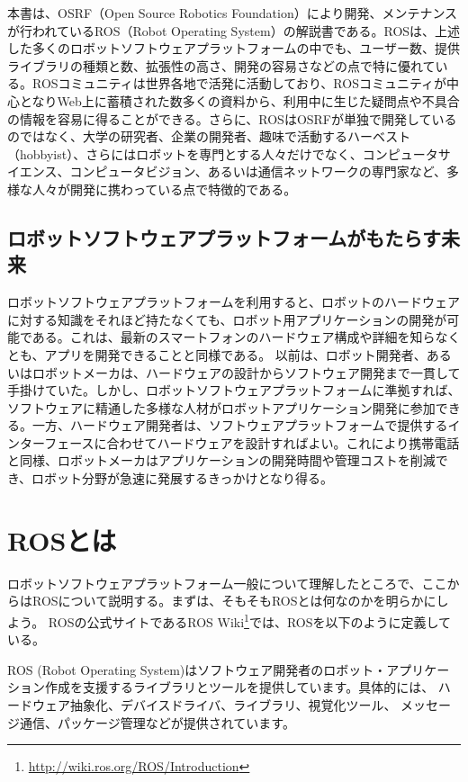 本書は、OSRF（Open Source Robotics Foundation）により開発、メンテナンスが行われているROS（Robot Operating System）の解説書である。ROSは、上述した多くのロボットソフトウェアプラットフォームの中でも、ユーザー数、提供ライブラリの種類と数、拡張性の高さ、開発の容易さなどの点で特に優れている。ROSコミュニティは世界各地で活発に活動しており、ROSコミュニティが中心となりWeb上に蓄積された数多くの資料から、利用中に生じた疑問点や不具合の情報を容易に得ることができる。さらに、ROSはOSRFが単独で開発しているのではなく、大学の研究者、企業の開発者、趣味で活動するハーベスト（hobbyist）、さらにはロボットを専門とする人々だけでなく、コンピュータサイエンス、コンピュータビジョン、あるいは通信ネットワークの専門家など、多様な人々が開発に携わっている点で特徴的である。

\subsection{ロボットソフトウェアプラットフォームがもたらす未来}

ロボットソフトウェアプラットフォームを利用すると、ロボットのハードウェアに対する知識をそれほど持たなくても、ロボット用アプリケーションの開発が可能である。これは、最新のスマートフォンのハードウェア構成や詳細を知らなくとも、アプリを開発できることと同様である。
以前は、ロボット開発者、あるいはロボットメーカは、ハードウェアの設計からソフトウェア開発まで一貫して手掛けていた。しかし、ロボットソフトウェアプラットフォームに準拠すれば、ソフトウェアに精通した多様な人材がロボットアプリケーション開発に参加できる。一方、ハードウェア開発者は、ソフトウェアプラットフォームで提供するインターフェースに合わせてハードウェアを設計すればよい。これにより携帯電話と同様、ロボットメーカはアプリケーションの開発時間や管理コストを削減でき、ロボット分野が急速に発展するきっかけとなり得る。

\section{ROSとは}

ロボットソフトウェアプラットフォーム一般について理解したところで、ここからはROSについて説明する。まずは、そもそもROSとは何なのかを明らかにしよう。
ROSの公式サイトであるROS Wiki\footnote{\url{http://wiki.ros.org/ROS/Introduction}}では、ROSを以下のように定義している。

ROS (Robot Operating System)はソフトウェア開発者のロボット・アプリケーション作成を支援するライブラリとツールを提供しています。具体的には、 ハードウェア抽象化、デバイスドライバ、ライブラリ、視覚化ツール、 メッセージ通信、パッケージ管理などが提供されています。

